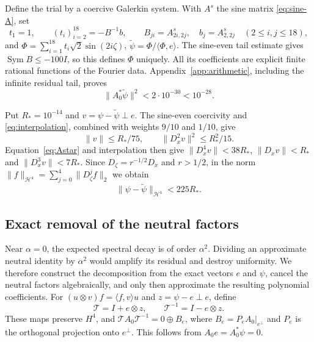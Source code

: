 \documentclass[a4paper,11pt]{article}
\numberwithin{equation}{section}
\theoremstyle{definition}
\theoremstyle{remark}
\newcommand{\Sym}{\operatorname{Sym}}
\newcommand{\norm}[1]{\lVert#1\rVert}
\newcommand{\ip}[2]{\langle#1,#2\rangle}
\newcommand{\calT}{\mathcal T}
\begin{document}
Define the trial by a coercive Galerkin system. With $A^s$ the sine matrix \eqref{eq:sine-A}, set
\begin{equation}\label{eq:galerkin-trial}
 t_1=1,\qquad (t_i)_{i=2}^{18}=-B^{-1}b,\qquad
 B_{ji}=A^s_{2i,2j},\quad b_j=A^s_{2,2j}\quad(2\le i,j\le18),
\end{equation}
and $\Phi=\sum_{i=1}^{18}t_i\sqrt2\sin(2i\zeta)$, $\widetilde\psi=\Phi/\ip\Phi e$.
The sine-even tail estimate gives $\Sym B\le-100I$, so this defines $\Phi$ uniquely. All its coefficients are explicit finite rational functions of the Fourier data.
Appendix~\ref{app:arithmetic}, including the infinite residual tail, proves
\begin{equation}\label{eq:adjoint-data}
 \norm{A_0^*\widetilde\psi}^2<2\cdot10^{-30}<10^{-28}.
\end{equation}


Put $R_*=10^{-14}$ and $v=\psi-\widetilde\psi\perp e$. The sine-even coercivity and \eqref{eq:interpolation}, combined with weights $9/10$ and $1/10$, give
\[
 \norm v\le R_*/75,\qquad \norm{D_x^2v}^2\le R_*^2/15.
\]
Equation~\eqref{eq:Astar} and interpolation then give $\norm{D_x^4v}<38R_*$, $\norm{D_xv}<R_*$ and $\norm{D_x^3v}<7R_*$. Since $D_\zeta=r^{-1/2}D_x$ and $r>1/2$, in the norm $\norm f_{\mathcal H^4}=\sum_{j=0}^4\norm{D_\zeta^jf}_2$ we obtain
\begin{equation}\label{eq:adjoint-H4}
 \norm{\psi-\widetilde\psi}_{\mathcal H^4}<225R_*.
\end{equation}

\subsection{Exact removal of the neutral factors}
Near $\alpha=0$, the expected spectral decay is of order $\alpha^2$. Dividing an approximate neutral identity by $\alpha^2$ would amplify its residual and destroy uniformity. We therefore construct the decomposition from the exact vectors $e$ and $\psi$, cancel the neutral factors algebraically, and only then approximate the resulting polynomial coefficients.
For $(u\otimes v)f=\ip f v u$ and $z=\psi-e\perp e$, define
\begin{equation}\label{eq:T}
 \calT=I+e\otimes z,\qquad \calT^{-1}=I-e\otimes z.
\end{equation}
These maps preserve $H^4$, and $\calT A_0\calT^{-1}=0\oplus B_e$, where $B_e=P_eA_0|_{e^\perp}$ and $P_e$ is the orthogonal projection onto $e^\perp$. This follows from $A_0e=A_0^*\psi=0$.
\end{document}
